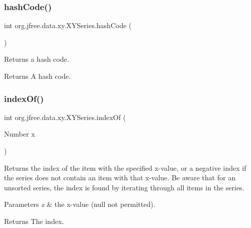 \subsubsection{\texorpdfstring{hash\+Code()}{hashCode()}}
{\footnotesize\ttfamily int org.\+jfree.\+data.\+xy.\+X\+Y\+Series.\+hash\+Code (\begin{DoxyParamCaption}{ }\end{DoxyParamCaption})}

Returns a hash code.

\begin{DoxyReturn}{Returns}
A hash code. 
\end{DoxyReturn}
\mbox{\label{classorg_1_1jfree_1_1data_1_1xy_1_1_x_y_series_a47c4d69bb286bfd3cfb08a80e426d450}} 
\subsubsection{\texorpdfstring{index\+Of()}{indexOf()}}
{\footnotesize\ttfamily int org.\+jfree.\+data.\+xy.\+X\+Y\+Series.\+index\+Of (\begin{DoxyParamCaption}\item[{Number}]{x }\end{DoxyParamCaption})}

Returns the index of the item with the specified x-\/value, or a negative index if the series does not contain an item with that x-\/value. Be aware that for an unsorted series, the index is found by iterating through all items in the series.


\begin{DoxyParams}{Parameters}
{\em x} & the x-\/value ({\ttfamily null} not permitted).\\
\hline
\end{DoxyParams}
\begin{DoxyReturn}{Returns}
The index. 
\end{DoxyReturn}
\mbox{\label{classorg_1_1jfree_1_1data_1_1xy_1_1_x_y_series_a844117c999497a1e5e27f8b005e57535}} 
